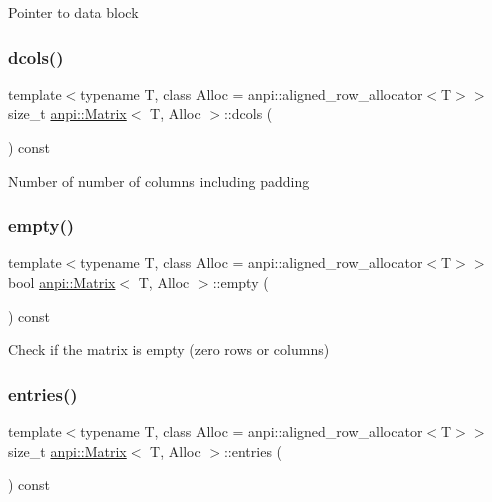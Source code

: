 Pointer to data block \mbox{\label{classanpi_1_1Matrix_a594c8611746bd66eb00929cb300d8679}} 
\subsubsection{\texorpdfstring{dcols()}{dcols()}}
{\footnotesize\ttfamily template$<$typename T, class Alloc = anpi\+::aligned\+\_\+row\+\_\+allocator$<$\+T$>$$>$ \\
size\+\_\+t \hyperlink{classanpi_1_1Matrix}{anpi\+::\+Matrix}$<$ T, Alloc $>$\+::dcols (\begin{DoxyParamCaption}{ }\end{DoxyParamCaption}) const\hspace{0.3cm}{\ttfamily [inline]}}

Number of number of columns including padding \mbox{\label{classanpi_1_1Matrix_ac8ba7d3cfd24775cfd9d55aed3067304}} 
\subsubsection{\texorpdfstring{empty()}{empty()}}
{\footnotesize\ttfamily template$<$typename T, class Alloc = anpi\+::aligned\+\_\+row\+\_\+allocator$<$\+T$>$$>$ \\
bool \hyperlink{classanpi_1_1Matrix}{anpi\+::\+Matrix}$<$ T, Alloc $>$\+::empty (\begin{DoxyParamCaption}{ }\end{DoxyParamCaption}) const\hspace{0.3cm}{\ttfamily [inline]}}

Check if the matrix is empty (zero rows or columns) \mbox{\label{classanpi_1_1Matrix_a6734aca0aa7a6948a2ab05400df132d1}} 
\subsubsection{\texorpdfstring{entries()}{entries()}}
{\footnotesize\ttfamily template$<$typename T, class Alloc = anpi\+::aligned\+\_\+row\+\_\+allocator$<$\+T$>$$>$ \\
size\+\_\+t \hyperlink{classanpi_1_1Matrix}{anpi\+::\+Matrix}$<$ T, Alloc $>$\+::entries (\begin{DoxyParamCaption}{ }\end{DoxyParamCaption}) const\hspace{0.3cm}{\ttfamily [inline]}}

